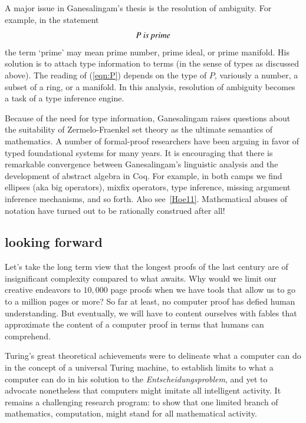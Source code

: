 \documentclass{llncs}
\begin{document}
A major issue in Ganesalingam's thesis is the resolution of ambiguity.
For example, in the statement
\begin{equation}\label{eqn:P}
P \text{\it ~is prime}
\end{equation}
the term `prime' may mean prime number, prime ideal, or prime
manifold.  His solution is to attach type information to terms (in the
sense of types as discussed above).  The reading of (\ref{eqn:P})
depends on the type of $P$, variously a number, a subset of a ring, or
a manifold.  In this analysis, resolution of ambiguity becomes a task
of a type inference engine.

Because of the need for type information, Ganesalingam raises
questions about the suitability of Zermelo-Fraenkel set theory as the
ultimate semantics of mathematics.  A number of formal-proof
researchers have been arguing in favor of typed foundational systems
for many years.  It is encouraging that there is remarkable
convergence between Ganesalingam's linguistic analysis and the
development of abstract algebra in Coq. For example, in both camps we
find ellipses (aka big operators), mixfix operators, type inference,
missing argument inference mechanisms, and so forth.  Also
see~\ref{Hoe11}.  Mathematical abuses of notation have turned out to
be rationally construed after all! 



\subsection{looking forward}

Let's take the long term view that the longest proofs of the last
century are of insignificant complexity compared to what awaits.  Why
would we limit our creative endeavors to $10,000$ page proofs when we
have tools that allow us to go to a million pages or more?  So far at
least, no computer proof has defied human understanding.  But
eventually, we will have to content ourselves with fables that
approximate the content of a computer proof in terms that humans can
comprehend.


Turing's great theoretical achievements were to delineate what a
computer can do in the concept of a universal Turing machine, to
establish limits to what a computer can do in his solution to the {\it
  Entscheidungsproblem}, and yet to advocate nonetheless that
computers might imitate all intelligent activity. It remains a
challenging research program: to show that one limited branch of
mathematics, computation, might stand for all mathematical activity.
\end{document}
